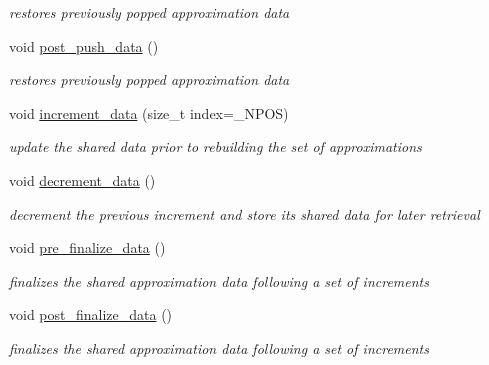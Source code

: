 \begin{DoxyCompactItemize}
\begin{DoxyCompactList}\small\item\em restores previously popped approximation data \end{DoxyCompactList}\item 
void \hyperlink{classPecos_1_1SharedProjectOrthogPolyApproxData_ac19cc0185f757af210f8bc3a31dc85b7}{post\+\_\+push\+\_\+data} ()\label{classPecos_1_1SharedProjectOrthogPolyApproxData_ac19cc0185f757af210f8bc3a31dc85b7}

\begin{DoxyCompactList}\small\item\em restores previously popped approximation data \end{DoxyCompactList}\item 
void \hyperlink{classPecos_1_1SharedProjectOrthogPolyApproxData_a4890d7d6305c020f7b6885b46760bc1f}{increment\+\_\+data} (size\+\_\+t index=\+\_\+\+N\+P\+OS)\label{classPecos_1_1SharedProjectOrthogPolyApproxData_a4890d7d6305c020f7b6885b46760bc1f}

\begin{DoxyCompactList}\small\item\em update the shared data prior to rebuilding the set of approximations \end{DoxyCompactList}\item 
void \hyperlink{classPecos_1_1SharedProjectOrthogPolyApproxData_a60174b370eea362e66f5e90876f3c1be}{decrement\+\_\+data} ()\label{classPecos_1_1SharedProjectOrthogPolyApproxData_a60174b370eea362e66f5e90876f3c1be}

\begin{DoxyCompactList}\small\item\em decrement the previous increment and store its shared data for later retrieval \end{DoxyCompactList}\item 
void \hyperlink{classPecos_1_1SharedProjectOrthogPolyApproxData_a9fedd7fa45f9bfa49d99507fe7bdaca2}{pre\+\_\+finalize\+\_\+data} ()\label{classPecos_1_1SharedProjectOrthogPolyApproxData_a9fedd7fa45f9bfa49d99507fe7bdaca2}

\begin{DoxyCompactList}\small\item\em finalizes the shared approximation data following a set of increments \end{DoxyCompactList}\item 
void \hyperlink{classPecos_1_1SharedProjectOrthogPolyApproxData_a627c3fbb950715823e57acd6bfa0fd72}{post\+\_\+finalize\+\_\+data} ()\label{classPecos_1_1SharedProjectOrthogPolyApproxData_a627c3fbb950715823e57acd6bfa0fd72}

\begin{DoxyCompactList}\small\item\em finalizes the shared approximation data following a set of increments \end{DoxyCompactList}\end{DoxyCompactItemize}
